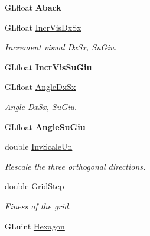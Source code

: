 \begin{DoxyCompactItemize}
\item 
\hypertarget{classDraw_aec50037c9399a63029b700998c5fb571}{\-G\-Lfloat {\bfseries \-Aback}}\label{classDraw_aec50037c9399a63029b700998c5fb571}

\item 
\hypertarget{classDraw_a845a34fce40581505bbba9cceb8a7266}{\-G\-Lfloat \hyperlink{classDraw_a845a34fce40581505bbba9cceb8a7266}{\-Incr\-Vis\-Dx\-Sx}}\label{classDraw_a845a34fce40581505bbba9cceb8a7266}

\begin{DoxyCompactList}\small\item\em \-Increment visual \-Dx\-Sx, \-Su\-Giu. \end{DoxyCompactList}\item 
\hypertarget{classDraw_a93ae32650d64100b155fc7895c96b80b}{\-G\-Lfloat {\bfseries \-Incr\-Vis\-Su\-Giu}}\label{classDraw_a93ae32650d64100b155fc7895c96b80b}

\item 
\hypertarget{classDraw_ac4d6a04b585898500e8de28bfb0a926b}{\-G\-Lfloat \hyperlink{classDraw_ac4d6a04b585898500e8de28bfb0a926b}{\-Angle\-Dx\-Sx}}\label{classDraw_ac4d6a04b585898500e8de28bfb0a926b}

\begin{DoxyCompactList}\small\item\em \-Angle \-Dx\-Sx, \-Su\-Giu. \end{DoxyCompactList}\item 
\hypertarget{classDraw_a08a47162402b1a4ba83ebfd799b833e9}{\-G\-Lfloat {\bfseries \-Angle\-Su\-Giu}}\label{classDraw_a08a47162402b1a4ba83ebfd799b833e9}

\item 
\hypertarget{classDraw_ae460da3c47449cbbd76b22e9c2501a69}{double \hyperlink{classDraw_ae460da3c47449cbbd76b22e9c2501a69}{\-Inv\-Scale\-Un}}\label{classDraw_ae460da3c47449cbbd76b22e9c2501a69}

\begin{DoxyCompactList}\small\item\em \-Rescale the three orthogonal directions. \end{DoxyCompactList}\item 
\hypertarget{classDraw_a48af8052c97c27dcadc5524421180495}{double \hyperlink{classDraw_a48af8052c97c27dcadc5524421180495}{\-Grid\-Step}}\label{classDraw_a48af8052c97c27dcadc5524421180495}

\begin{DoxyCompactList}\small\item\em \-Finess of the grid. \end{DoxyCompactList}\item 
\hypertarget{classDraw_ab3a3a889149c8b1ff7e39ca3c032f16c}{\-G\-Luint \hyperlink{classDraw_ab3a3a889149c8b1ff7e39ca3c032f16c}{\-Hexagon}}\label{classDraw_ab3a3a889149c8b1ff7e39ca3c032f16c}


\end{DoxyCompactItemize}
